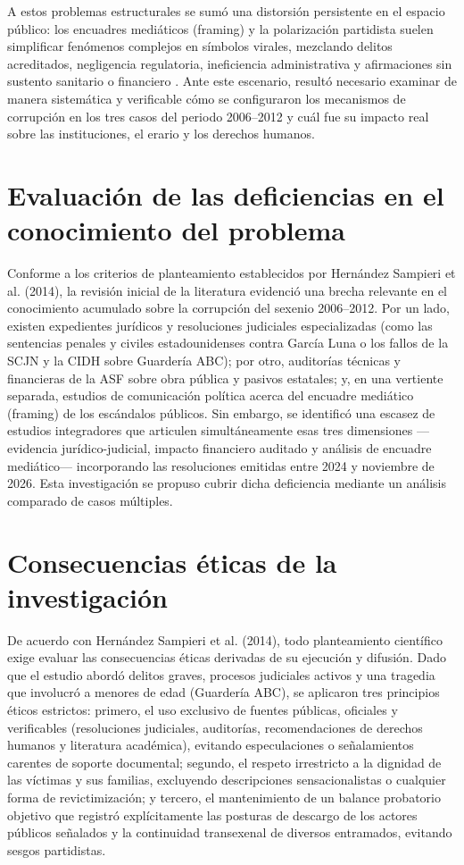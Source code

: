 A estos problemas estructurales se sumó una distorsión persistente en el espacio público: los encuadres mediáticos (framing) y la polarización partidista suelen simplificar fenómenos complejos en símbolos virales, mezclando delitos acreditados, negligencia regulatoria, ineficiencia administrativa y afirmaciones sin sustento sanitario o financiero \citep{solamorales2019}. Ante este escenario, resultó necesario examinar de manera sistemática y verificable cómo se configuraron los mecanismos de corrupción en los tres casos del periodo 2006--2012 y cuál fue su impacto real sobre las instituciones, el erario y los derechos humanos.

\section{Evaluación de las deficiencias en el conocimiento del problema}

Conforme a los criterios de planteamiento establecidos por Hernández Sampieri et al. (2014), la revisión inicial de la literatura evidenció una brecha relevante en el conocimiento acumulado sobre la corrupción del sexenio 2006--2012. Por un lado, existen expedientes jurídicos y resoluciones judiciales especializadas (como las sentencias penales y civiles estadounidenses contra García Luna o los fallos de la SCJN y la CIDH sobre Guardería ABC); por otro, auditorías técnicas y financieras de la ASF sobre obra pública y pasivos estatales; y, en una vertiente separada, estudios de comunicación política acerca del encuadre mediático (framing) de los escándalos públicos. Sin embargo, se identificó una escasez de estudios integradores que articulen simultáneamente esas tres dimensiones ---evidencia jurídico-judicial, impacto financiero auditado y análisis de encuadre mediático--- incorporando las resoluciones emitidas entre 2024 y noviembre de 2026. Esta investigación se propuso cubrir dicha deficiencia mediante un análisis comparado de casos múltiples.

\section{Consecuencias éticas de la investigación}

De acuerdo con Hernández Sampieri et al. (2014), todo planteamiento científico exige evaluar las consecuencias éticas derivadas de su ejecución y difusión. Dado que el estudio abordó delitos graves, procesos judiciales activos y una tragedia que involucró a menores de edad (Guardería ABC), se aplicaron tres principios éticos estrictos: primero, el uso exclusivo de fuentes públicas, oficiales y verificables (resoluciones judiciales, auditorías, recomendaciones de derechos humanos y literatura académica), evitando especulaciones o señalamientos carentes de soporte documental; segundo, el respeto irrestricto a la dignidad de las víctimas y sus familias, excluyendo descripciones sensacionalistas o cualquier forma de revictimización; y tercero, el mantenimiento de un balance probatorio objetivo que registró explícitamente las posturas de descargo de los actores públicos señalados y la continuidad transexenal de diversos entramados, evitando sesgos partidistas.